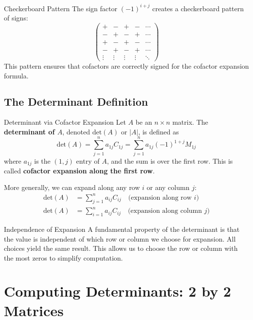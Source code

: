 \documentclass[12pt,a4paper]{article}
\newcommand{\Det}{\text{det}}
\begin{document}
	\begin{remark}{Checkerboard Pattern}
		The sign factor $(-1)^{i+j}$ creates a checkerboard pattern of signs:
		\[
		\begin{pmatrix}
			+ & - & + & - & \cdots \\
			- & + & - & + & \cdots \\
			+ & - & + & - & \cdots \\
			- & + & - & + & \cdots \\
			\vdots & \vdots & \vdots & \vdots & \ddots
		\end{pmatrix}
		\]
		This pattern ensures that cofactors are correctly signed for the cofactor expansion formula.
	\end{remark}
	
	\subsection{The Determinant Definition}
	
	\begin{definition}{Determinant via Cofactor Expansion}
		Let $A$ be an $n \times n$ matrix. The \textbf{determinant of $A$}, denoted $\Det(A)$ or $|A|$, is defined as
		\[
		\Det(A) = \sum_{j=1}^{n} a_{1j} C_{1j} = \sum_{j=1}^{n} a_{1j} (-1)^{1+j} M_{1j}
		\]
		where $a_{1j}$ is the $(1,j)$ entry of $A$, and the sum is over the first row. This is called \textbf{cofactor expansion along the first row}.
		
		More generally, we can expand along any row $i$ or any column $j$:
		\begin{align*}
			\Det(A) &= \sum_{j=1}^{n} a_{ij} C_{ij} \quad \text{(expansion along row } i \text{)} \\
			\Det(A) &= \sum_{i=1}^{n} a_{ij} C_{ij} \quad \text{(expansion along column } j \text{)}
		\end{align*}
	\end{definition}
	
	\begin{remark}{Independence of Expansion}
		A fundamental property of the determinant is that the value is independent of which row or column we choose for expansion. All choices yield the same result. This allows us to choose the row or column with the most zeros to simplify computation.
	\end{remark}
	
	\newpage
	
	\section{Computing Determinants: 2 by 2 Matrices}
	
\end{document}

